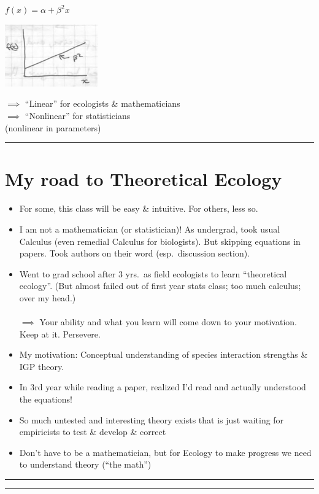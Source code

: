 \documentclass{article}
\begin{document}
\begin{multicols}{3}
	$f(x) = \alpha + \beta^2 x$\\
	
	\columnbreak
	
	\includegraphics[width=4cm]{figs/img8}
	
	\columnbreak
	
	$\implies$ ``Linear''  for ecologists \& mathematicians\\
	$\implies$ ``Nonlinear'' for statisticians\\
	(nonlinear in parameters)
\end{multicols}

\rule[0.5ex]{\linewidth}{1pt}

\section*{My road to Theoretical Ecology}
\begin{itemize}
	\item For some, this class will be easy \& intuitive.  For others, less so.
	\item I am not a mathematician (or statistician)!  As undergrad, took usual Calculus (even remedial Calculus for biologists).  But skipping equations in papers.  Took authors on their word (esp.~discussion section).
	\item Went to grad school after 3 yrs.~as field ecologists to learn ``theoretical ecology''. (But almost failed out of first year stats class; too much calculus; over my head.)\\\\
	$\implies$ Your ability and what you learn will come down to your motivation.  Keep at it.  Persevere.
	\item My motivation: Conceptual understanding of species interaction strengths \& IGP theory.
	\item In 3rd year while reading a paper, realized I'd read and actually understood the equations!\\
	\item So much untested and interesting theory exists that is just waiting for empiricists to test \& develop \& correct
	\item Don't have to be a mathematician, but for Ecology to make progress we need to understand theory (``the math'') 
\end{itemize}

\rule[0.5ex]{\linewidth}{1pt}
\rule[0.5ex]{\linewidth}{1pt}
\end{document}
